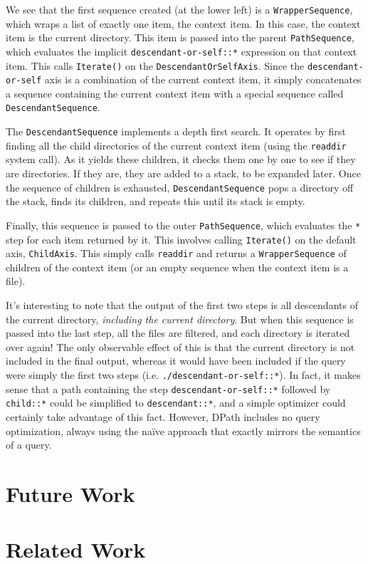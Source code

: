 \documentclass{scrartcl}
\begin{document}
We see that the first sequence created (at the lower left) is a
\texttt{WrapperSequence}, which wraps a list of exactly one item, the context
item. In this case, the context item is the current directory. This item is
passed into the parent \texttt{PathSequence}, which evaluates the implicit
\texttt{descendant-or-self::*} expression on that context item. This calls
\texttt{Iterate()} on the \texttt{DescendantOrSelfAxis}. Since the
\texttt{descendant-or-self} axis is a combination of the current context item,
it simply concatenates a sequence containing the current context item with a
special sequence called \texttt{DescendantSequence}.

The \texttt{DescendantSequence} implements a depth first search. It operates by
first finding all the child directories of the current context item (using the
\texttt{readdir} system call). As it yields these children, it checks them one
by one to see if they are directories. If they are, they are added to a stack,
to be expanded later. Once the sequence of children is exhausted,
\texttt{DescendantSequence} pops a directory off the stack, finds its children,
and repeats this until its stack is empty.

Finally, this sequence is passed to the outer \texttt{PathSequence}, which
evaluates the \texttt{*} step for each item returned by it. This involves
calling \texttt{Iterate()} on the default axis, \texttt{ChildAxis}. This simply
calls \texttt{readdir} and returns a \texttt{WrapperSequence} of children of the
context item (or an empty sequence when the context item is a file).

It's interesting to note that the output of the first two steps is all
descendants of the current directory, \emph{including the current directory}.
But when this sequence is passed into the last step, all the files are filtered,
and each directory is iterated over again! The only observable effect of this is
that the current directory is not included in the final output, whereas it would
have been included if the query were simply the first two steps (i.e.
\texttt{./descendant-or-self::*}). In fact, it makes sense that a path
containing the step \texttt{descendant-or-self::*} followed by \texttt{child::*}
could be simplified to \texttt{descendant::*}, and a simple optimizer could
certainly take advantage of this fact. However, DPath includes no query
optimization, always using the na\"ive approach that exactly mirrors the
semantics of a query.

\section{Future Work}
\label{sec:future}

\section{Related Work}
\label{sec:related}




\end{document}
